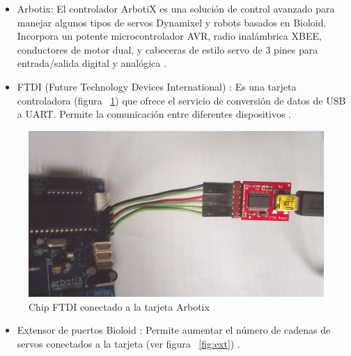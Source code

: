 \begin{itemize}
\item Arbotix: El controlador ArbotiX es una solución de control avanzado para manejar algunos tipos de servos Dynamixel y robots
basados en Bioloid. Incorpora un potente microcontrolador AVR, radio inalámbrica XBEE, conductores de motor dual, y cabeceras
de estilo servo de 3 pines para entrada/salida digital y analógica \cite{arbotix}.

\end{itemize}


\begin{itemize}
\item FTDI (Future Technology Devices International) : Es una tarjeta controladora  (figura ~\ref{fig:ftdi}) que ofrece el servicio de conversión de  datos de USB a UART. Permite la comunicación entre diferentes dispositivos \cite{ftdi}.

\end{itemize}

\begin{figure}[hbtp]
\centering
\includegraphics[scale=0.06]{imagenes/DSCF1162.jpg}
\caption{Chip FTDI conectado a la tarjeta Arbotix}
\label{fig:ftdi}
\end{figure}

\begin{itemize}
\item Extensor de puertos Bioloid : Permite aumentar el número de cadenas de servos conectados a la tarjeta (ver figura ~\ref{fig:ext}) \cite{hub}.
\end{itemize}

